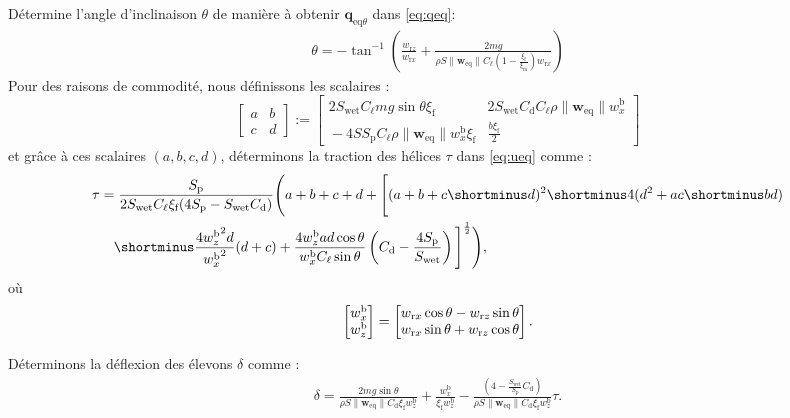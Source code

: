 \begin{algorithm}
\begin{algorithmic}[1]
        \State Détermine l'angle d'inclinaison $\theta$ de manière à obtenir $\boldsymbol{q}_{\text{eq}\theta}$ dans \eqref{eq:qeq}:  
        \begin{align}
        \label{eq:theta_alg}
            \theta = -\tan^{-1}\left(\frac{w_{\text{r}z}}{w_{\text{r}x}} + \frac{2mg}{\rho S \lVert \boldsymbol{w}_{\mathrm{eq}} \rVert C_{\ell}  (1-\frac{\xi_{\text{f}}}{\xi_{\text{m}}}) w_{\text{r}x} } \right)
        \end{align}
    \State Pour des raisons de commodité, nous définissons les scalaires :
        $$ 
        \left[\begin{array}{c|c} 
        \!\!a\!\!&\!\!b\!\! \\ \hline \!\!c\!\!&\!\! d\!\!\end{array}  \right] \!:=\! 
        \left[\begin{array}{c|c}
        2 S_{\text{wet}} C_{\ell} mg \sin{\theta} \xi_{\text{f}} &
        \! 2 S_{\text{wet}} C_{\text{d}} C_{\ell} \rho  \lVert \boldsymbol{w}_{\mathrm{eq}} \rVert  w_{x}^{\text{b}}\!\! \\ \hline
        \!\!-4 S S_{\text{p}} C_{\ell} \rho  \lVert \boldsymbol{w}_{\mathrm{eq}} \rVert  w_{x}^{\text{b}} \xi_{\text{f}}\!\! & \frac{b \xi_{\text{f}}}{2}
        \end{array}\right]
        $$ 
        et grâce à ces scalaires $(a,b,c,d)$, déterminons la traction des hélices $\tau$ dans \eqref{eq:ueq} comme :
        \begin{align}
            \nonumber
            \tau &= \frac{S_{\text{p}}}{2 S_{\text{wet}} C_{\ell} \xi_{\text{f}} (4S_{\text{p}} -  S_{\text{wet}} C_{\text{d}} )} \Bigg( a+b+c+d + \Bigg[ (a+b+c \shortminus d)^2 \shortminus 4 (d^2+ac \shortminus bd)  \\ 
            & \quad
            \shortminus \frac{4 {w_{z}^{\text{b}}}^2 d}{ {w_{x}^{\text{b}}}^2 } (d+c) + \frac{4 w_{z}^{\text{b}}ad\cos{\theta}}{w_{x}^{\text{b}} C_{\ell} \sin{\theta} } \left(C_{\text{d}} - \frac{4 S_{\text{p}}}{S_{\text{wet}}}\right) \Bigg] ^{\frac{1}{2}} \Bigg),\label{eq:tau_alg}
        \end{align}
        où
        $$
        \begin{bmatrix}w_{x}^{\text{b}} \\ w_{z}^{\text{b}} \end{bmatrix} = \begin{bmatrix}   w_{\text{r}x} \cos{\theta} - w_{\text{r}z} \sin{\theta}\\
                    w_{\text{r}x} \sin{\theta} +  w_{\text{r}z} \cos{\theta}  \end{bmatrix}.
        $$
        
        \State Déterminons la déflexion des élevons $\delta$ comme :
        \begin{align}
        \label{eq:delta_alg}
            \delta = \frac{2mg\sin{\theta}}{\rho S \lVert \boldsymbol{w}_{\mathrm{eq}} \rVert C_{\text{d}}\xi_{\text{f}} w_{z}^{\text{b}}} + \frac{w_{x}^{\text{b}}}{\xi_{\text{f}}w_{z}^{\text{b}}} -  \frac{(4-\frac{S_{\text{wet}}}{S_{\text{p}}} C_{\text{d}})}{\rho S \lVert \boldsymbol{w}_{\mathrm{eq}} \rVert C_{\text{d}}\xi_{\text{f}} w_{z}^{\text{b}}} \tau.
        \end{align}


\end{algorithmic}
\end{algorithm}
